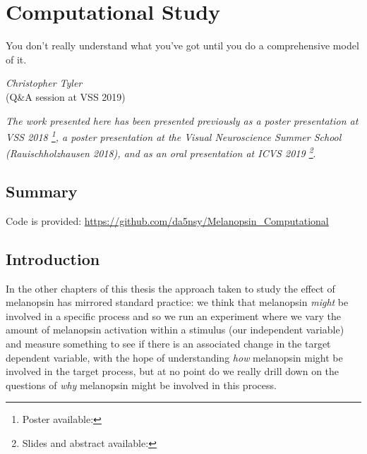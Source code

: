 \chapter{Computational Study}
\label{chap:Melcomp}

\epigraph{You don't really understand what you've got until you do a comprehensive model of it.}
{\textit{Christopher Tyler} \\ (Q\&A session at VSS 2019)}

\textit{The work presented here has been presented previously as a poster presentation at VSS 2018 \citep{garside_does_2018}\footnote{Poster available: }, a poster presentation at the Visual Neuroscience Summer School (Rauischholzhausen 2018), and as an oral presentation at ICVS 2019 \footnote{Slides and abstract available: }}.

\section{Summary}



Code is provided: \url{https://github.com/da5nsy/Melanopsin_Computational}

\section{Introduction}

In the other chapters of this thesis the approach taken to study the effect of melanopsin has mirrored standard practice: we think that melanopsin \emph{might} be involved in a specific process and so we run an experiment where we vary the amount of melanopsin activation within a stimulus (our independent variable) and measure something to see if there is an associated change in the target dependent variable, with the hope of understanding \emph{how} melanopsin might be involved in the target process, but at no point do we really drill down on the questions of \emph{why} melanopsin might be involved in this process.

